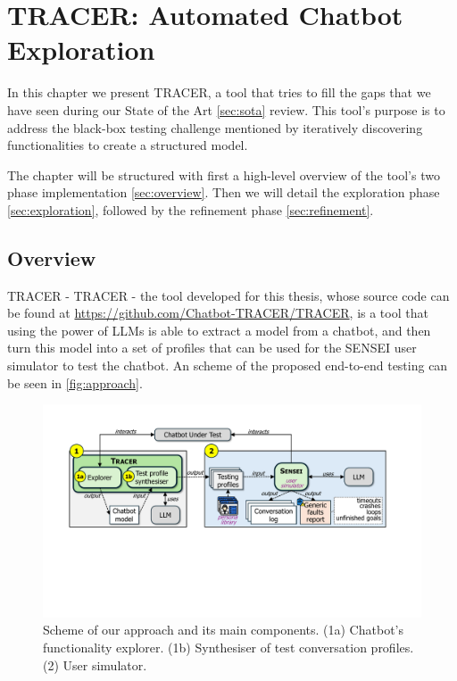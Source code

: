
\chapter{TRACER: Automated Chatbot Exploration}\label{chapter:tracer}

In this chapter we present \ac{TRACER},
a tool that tries to fill the gaps that we have seen
during our State of the Art \autoref{sec:sota} review.
This tool's purpose is to address the black-box testing challenge mentioned
by iteratively discovering functionalities
to create a structured model.

The chapter will be structured with first
a high-level overview of the tool's two phase implementation \autoref{sec:overview}.
Then we will detail the exploration phase \autoref{sec:exploration},
followed by the refinement phase \autoref{sec:refinement}.

\section{Overview}\label{sec:overview}

\ac{TRACER} - \acl{TRACER} - the tool developed for this thesis,
whose source code can be found at \url{https://github.com/Chatbot-TRACER/TRACER},
is a tool that using the power of \acp{LLM}
is able to extract a model from a chatbot,
and then turn this model into a set of profiles
that can be used for the SENSEI
\autocite{delaraSensei, delaraAutomatedEndtoEndTesting2025} user simulator
to test the chatbot.
An scheme of the proposed end-to-end testing
can be seen in \autoref{fig:approach}.

\begin{figure}[htpb]
  \centering
  \includegraphics[width=\linewidth]{figures/approach.pdf}
  \caption{Scheme of our approach and its main components.
    (1a) Chatbot’s functionality explorer.
    (1b) Synthesiser of test conversation profiles.
    (2) User simulator.}
  \label{fig:approach}
\end{figure}


